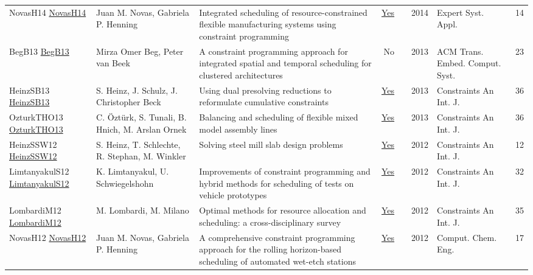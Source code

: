 {\begin{longtable}{p{3cm}p{6cm}p{7cm}rrrp{3cm}r}
NovasH14 \href{https://doi.org/10.1016/j.eswa.2013.09.026}{NovasH14} & Juan M. Novas, Gabriela P. Henning & Integrated scheduling of resource-constrained flexible manufacturing systems using constraint programming & \href{articles/NovasH14.pdf}{Yes} & \cite{NovasH14} & 2014 & Expert Syst. Appl. & 14\\
BegB13 \href{http://doi.acm.org/10.1145/2512470}{BegB13} & Mirza Omer Beg, Peter van Beek & A constraint programming approach for integrated spatial and temporal scheduling for clustered architectures & No & \cite{BegB13} & 2013 & {ACM} Trans. Embed. Comput. Syst. & 23\\
HeinzSB13 \href{https://doi.org/10.1007/s10601-012-9136-9}{HeinzSB13} & S. Heinz, J. Schulz, J. Christopher Beck & Using dual presolving reductions to reformulate cumulative constraints & \href{articles/HeinzSB13.pdf}{Yes} & \cite{HeinzSB13} & 2013 & Constraints An Int. J. & 36\\
OzturkTHO13 \href{https://doi.org/10.1007/s10601-013-9142-6}{OzturkTHO13} & C. {\"{O}}zt{\"{u}}rk, S. Tunali, B. Hnich, M. Arslan Ornek & Balancing and scheduling of flexible mixed model assembly lines & \href{articles/OzturkTHO13.pdf}{Yes} & \cite{OzturkTHO13} & 2013 & Constraints An Int. J. & 36\\
HeinzSSW12 \href{https://doi.org/10.1007/s10601-011-9113-8}{HeinzSSW12} & S. Heinz, T. Schlechte, R. Stephan, M. Winkler & Solving steel mill slab design problems & \href{articles/HeinzSSW12.pdf}{Yes} & \cite{HeinzSSW12} & 2012 & Constraints An Int. J. & 12\\
LimtanyakulS12 \href{https://doi.org/10.1007/s10601-012-9118-y}{LimtanyakulS12} & K. Limtanyakul, U. Schwiegelshohn & Improvements of constraint programming and hybrid methods for scheduling of tests on vehicle prototypes & \href{articles/LimtanyakulS12.pdf}{Yes} & \cite{LimtanyakulS12} & 2012 & Constraints An Int. J. & 32\\
LombardiM12 \href{https://doi.org/10.1007/s10601-011-9115-6}{LombardiM12} & M. Lombardi, M. Milano & Optimal methods for resource allocation and scheduling: a cross-disciplinary survey & \href{articles/LombardiM12.pdf}{Yes} & \cite{LombardiM12} & 2012 & Constraints An Int. J. & 35\\
NovasH12 \href{https://doi.org/10.1016/j.compchemeng.2012.01.005}{NovasH12} & Juan M. Novas, Gabriela P. Henning & A comprehensive constraint programming approach for the rolling horizon-based scheduling of automated wet-etch stations & \href{articles/NovasH12.pdf}{Yes} & \cite{NovasH12} & 2012 & Comput. Chem. Eng. & 17\\

\end{longtable}}
